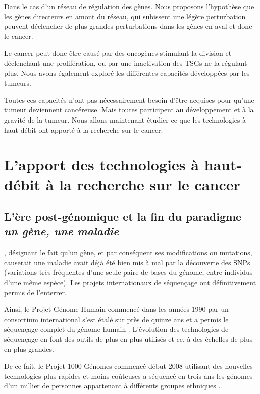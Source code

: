 			Dans le cas d'un réseau de régulation des gènes. Nous proposons l'hypothèse que les gènes directeurs en amont du réseau, qui subissent une légère perturbation peuvent déclencher de plus grandes perturbations dans les gènes en aval et donc le cancer.

			Le cancer peut donc être causé par des oncogènes stimulant la division et déclenchant une prolifération, ou par une inactivation des \acp{TSG} ne la régulant plus.
			Nous avons également exploré les différentes capacités développées par les tumeurs.

			Toutes ces capacités n'ont pas nécessairement besoin d'être acquises pour qu'une tumeur deviennent cancéreuse.
			Mais toutes participent au développement et à la gravité de la tumeur.
			Nous allons maintenant étudier ce que les technologies à haut-débit ont apporté à la recherche sur le cancer.

	\section{\textcolor{myred}{L'apport des technologies à haut-débit à la recherche sur le cancer}}

		\subsection{\textcolor{myred}{L'ère post-génomique et la fin du paradigme \emph{un gène, une maladie}}}
			, désignant le fait qu'un gène, et par conséquent ses modifications ou mutations, causerait une maladie avait déjà été bien mis à mal par la découverte des \acp{SNP} (variations très fréquentes d'une seule paire de bases du génome, entre individus d'une même espèce).
			Les projets internationaux de séquençage ont définitivement permis de l'enterrer.

			Ainsi, le Projet Génome Humain commencé dans les années 1990 par un consortium international s'est étalé sur près de quinze ans et a permis le séquençage complet du génome humain \citep{HGP2001}.
			L'évolution des technologies de séquençage en font des outils de plus en plus utilisés et ce, à des échelles de plus en plus grandes.

			De ce fait, le Projet 1000 Génomes commencé début 2008 utilisant des nouvelles technologies plus rapides et moins coûteuses a séquencé en trois ans les génomes d'un millier de personnes appartenant à différents groupes ethniques \citep{1000GPC2010}.

